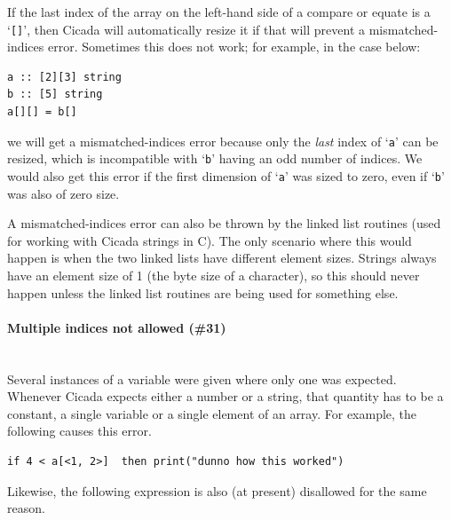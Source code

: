 \documentclass{article}
\newenvironment{code}{
       \begin{list}{}{
               \setlength{\leftmargin}{.4in}
               \setlength{\rightmargin}{0in}
               \setlength{\topsep}{.2in}
       }
       \small
       \item[] }
       { \end{list}   }
\begin{document}
If the last index of the array on the left-hand side of a compare or equate is a `\verb#[]#', then Cicada will automatically resize it if that will prevent a mismatched-indices error.  Sometimes this does not work; for example, in the case below:

\begin{code} \begin{verbatim}
a :: [2][3] string
b :: [5] string
a[][] = b[]
\end{verbatim} \end{code}

\noindent we will get a mismatched-indices error because only the \emph{last} index of `\verb#a#' can be resized, which is incompatible with `\verb#b#' having an odd number of indices.  We would also get this error if the first dimension of `\verb#a#' was sized to zero, even if `\verb#b#' was also of zero size.

A mismatched-indices error can also be thrown by the linked list routines (used for working with Cicada strings in C).  The only scenario where this would happen is when the two linked lists have different element sizes.  Strings always have an element size of 1 (the byte size of a character), so this should never happen unless the linked list routines are being used for something else.\\








\paragraph{Multiple indices not allowed (\#31)\\\\}

Several instances of a variable were given where only one was expected.  Whenever Cicada expects either a number or a string, that quantity has to be a constant, a single variable or a single element of an array.  For example, the following causes this error.

\begin{code} \begin{verbatim}
if 4 < a[<1, 2>]  then print("dunno how this worked")
\end{verbatim} \end{code}

\noindent Likewise, the following expression is also (at present) disallowed for the same reason.
\end{document}
